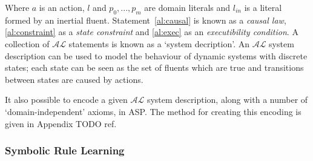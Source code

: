\documentclass[../interim.tex]{subfiles}
\begin{document}
Where $a$ is an action, $l$ and $p_0,...,p_m$ are domain literals and $l_{in}$ is a literal formed by an inertial fluent. Statement~\ref{al:causal} is known as a \textit{causal law}, \ref{al:constraint} as a \textit{state constraint} and \ref{al:exec} as an \textit{executibility condition}. A collection of $\mathcal{AL}$ statements is known as a `system decription'. An $\mathcal{AL}$ system description can be used to model the behaviour of dynamic systems with discrete states; each state can be seen as the set of fluents which are true and transitions between states are caused by actions.

It also possible to encode a given $\mathcal{AL}$ system description, along with a number of `domain-independent' axioms, in ASP. The method for creating this encoding is given in Appendix TODO ref. %

\subsubsection{Symbolic Rule Learning}
\end{document}
